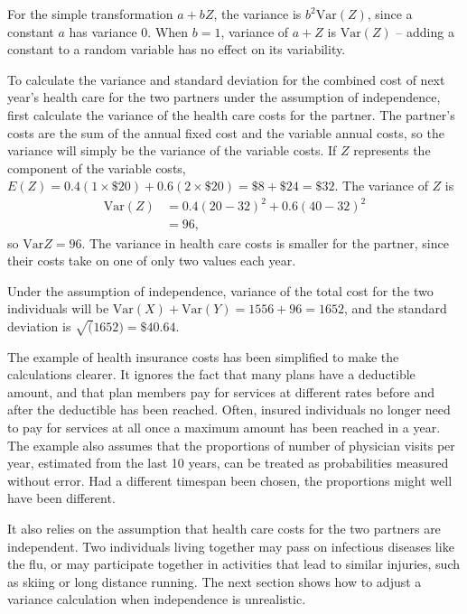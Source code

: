 For the simple transformation $a + bZ$, the variance is $b^{2} \text{Var}(Z)$, since a constant $a$ has variance 0.  When $b = 1$, variance of $a + Z$ is $\text{Var}(Z)$ -- adding a constant to a random variable has no effect on its variability.

To calculate the variance and standard deviation for the combined cost of next year's health care for the two partners under the assumption of independence, first calculate the variance of the health care costs for the partner. The partner's costs are the sum of the annual fixed cost and the variable annual costs, so the variance will simply be the variance of the variable costs. If $Z$ represents the component of the variable costs, $E(Z) = 0.4(1 \times \$20) + 0.6(2 \times \$20) = \$8 + \$24 = \$32$.  The variance of $Z$ is
\begin{align*}
	\textrm{Var}(Z) &= 0.4(20 - 32)^2 + 0.6(40 - 32)^2 \\
	   &= 96,
\end{align*}
so $\text{Var}{Z} = 96$. The variance in health care costs is smaller for the partner, since their costs take on one of only two values each year.

Under the assumption of independence, variance of the total cost for the two individuals will be $\text{Var}(X) + \text{Var}(Y) = 1556 + 96 = 1652$, and the standard deviation is $\sqrt(1652) = \$40.64$.


The example of health insurance costs has been simplified to make the calculations clearer.  It ignores the fact that many plans have a deductible amount, and that plan members pay for services at different rates before and after the deductible has been reached. Often, insured individuals no longer need to pay for services at all once a maximum amount has been reached in a year. The example also assumes that the proportions of number of physician visits per year, estimated from the last 10 years, can be treated as probabilities measured without error. Had a different timespan been chosen, the proportions might well have been different.  

It also relies on the assumption that health care costs for the two partners are independent.  Two individuals living together may pass on infectious diseases like the flu, or may participate together in activities that lead to similar injuries, such as skiing or long distance running.  The next section shows how to adjust a variance calculation when independence is unrealistic.

